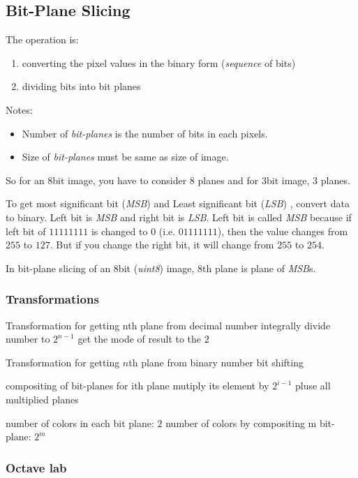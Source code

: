 \subsection{Bit-Plane Slicing}

The operation is:
\begin{enumerate}
    \item converting the pixel values in the binary form (\emph{sequence} of 
        bits)
    \item dividing bits into bit planes
\end{enumerate}

Notes:
\begin{itemize}
    \item Number of \emph{bit-planes} is the number of bits in each pixels.
    \item Size of \emph{bit-planes} must be same as size of image.
\end{itemize}

So for an 8bit image, you have to consider 8 planes and for 3bit image, 3 planes.

To get most significant bit (\emph{MSB}) and Least significant bit (\emph{LSB})
, convert data to binary. Left bit is \emph{MSB} and right bit is \emph{LSB}.
Left bit is called \emph{MSB} because if left bit of $11111111$ is changed to 
$0$ (i.e. $01111111$), then the value changes from $255$ to $127$. But if you 
change the right bit, it will change from $255$ to $254$.

In bit-plane slicing of an 8bit (\emph{uint8}) image, 8th plane is plane of 
\emph{MSB}s.

\subsubsection{Transformations}

Transformation for getting nth plane from decimal number
    integrally divide number to $2^{n-1}$ get the mode of result to the $2$

Transformation for getting $n$th plane from binary number
    bit shifting 

compositing of bit-planes
    for ith plane mutiply its element by $2^{i-1}$
    pluse all multiplied planes

number of colors in each bit plane: $2$
number of colors by compositing m bit-plane: $2^m$

\subsubsection{Octave lab}
